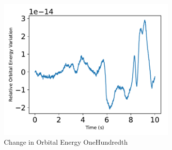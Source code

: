 \begin{figure}[htbp]\centerline{\includegraphics[width=0.8\textwidth]{AutoTeX/ChangeInOrbitalEnergyOneHundredth}}\caption{Change in Orbital Energy OneHundredth}\label{fig:ChangeInOrbitalEnergyOneHundredth}\end{figure}